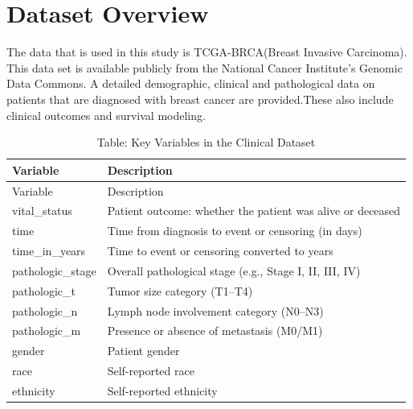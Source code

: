 \documentclass{article}
\begin{document}
\section{Dataset Overview}\label{dataset-overview}

The data that is used in this study is TCGA-BRCA(Breast Invasive Carcinoma). This data set is available publicly from the National Cancer Institute's Genomic Data Commons. A detailed demographic, clinical and pathological data on patients that are diagnosed with breast cancer are provided.These also include clinical outcomes and survival modeling.

\begin{longtable}[]{@{}
  >{\raggedright\arraybackslash}p{}
  >{\raggedright\arraybackslash}p{}@{}}
\caption{Table: Key Variables in the Clinical Dataset}\tabularnewline
\toprule\noalign{}
\begin{minipage}[b]{\linewidth}\raggedright
Variable
\end{minipage} & \begin{minipage}[b]{\linewidth}\raggedright
Description
\end{minipage} \\
\midrule\noalign{}
\endfirsthead
\toprule\noalign{}
\begin{minipage}[b]{\linewidth}\raggedright
Variable
\end{minipage} & \begin{minipage}[b]{\linewidth}\raggedright
Description
\end{minipage} \\
\midrule\noalign{}
\endhead
\bottomrule\noalign{}
\endlastfoot
vital\_status & Patient outcome: whether the patient was alive or deceased \\
time & Time from diagnosis to event or censoring (in days) \\
time\_in\_years & Time to event or censoring converted to years \\
pathologic\_stage & Overall pathological stage (e.g., Stage I, II, III, IV) \\
pathologic\_t & Tumor size category (T1--T4) \\
pathologic\_n & Lymph node involvement category (N0--N3) \\
pathologic\_m & Presence or absence of metastasis (M0/M1) \\
gender & Patient gender \\
race & Self-reported race \\
ethnicity & Self-reported ethnicity \\
\end{longtable}
\end{document}
